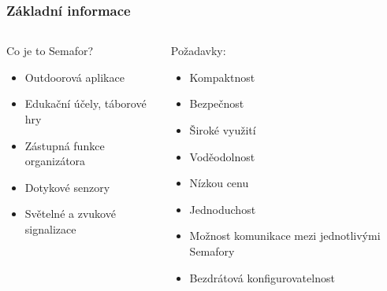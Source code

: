 \documentclass[%
  12pt,       				%
	t,                  %
	aspectratio=1610,   %
	unicode,						%
]{beamer}				    	%
\begin{document}
\disablenavigationsymbols

\maketitle

\begin{frame} 
	\frametitle{Základní informace}
	\begin{columns}[T] 								%
		\begin{column}{0.5\textwidth}		%
			Co je to Semafor?
			\begin{itemize}
				\item Outdoorová aplikace
				\item Edukační účely, táborové hry
				\item Zástupná funkce organizátora
				\item Dotykové senzory
				\item Světelné a zvukové signalizace
			\end{itemize}
		\end{column}
		\begin{column}{0.5\textwidth}		%
				Požadavky:
					\begin{itemize}
						\item Kompaktnost
						\item Bezpečnost
						\item Široké využití
						\item Voděodolnost
						\item Nízkou cenu
						\item Jednoduchost
						\item Možnost komunikace mezi jednotlivými Semafory
						\item Bezdrátová konfigurovatelnost
					\end{itemize}
		\end{column}
	\end{columns}	
\end{frame}
\end{document}
